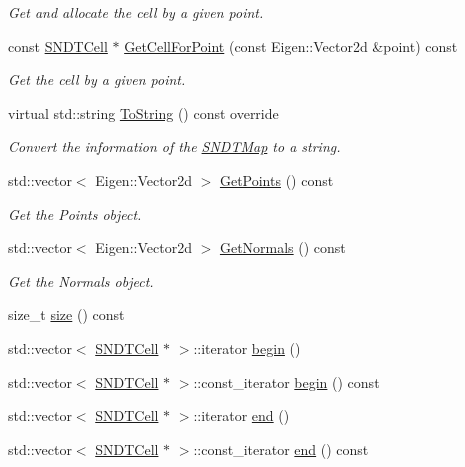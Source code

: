 \begin{DoxyCompactItemize}
\begin{DoxyCompactList}\small\item\em Get and allocate the cell by a given point. \end{DoxyCompactList}\item 
const \hyperlink{classSNDTCell}{S\+N\+D\+T\+Cell} $\ast$ \hyperlink{classSNDTMap_a6b7fa06144fcde3cb9e9df560d48bdee}{Get\+Cell\+For\+Point} (const Eigen\+::\+Vector2d \&point) const
\begin{DoxyCompactList}\small\item\em Get the cell by a given point. \end{DoxyCompactList}\item 
virtual std\+::string \hyperlink{classSNDTMap_a38be62c377da486f006e194e24e77212}{To\+String} () const override
\begin{DoxyCompactList}\small\item\em Convert the information of the \hyperlink{classSNDTMap}{S\+N\+D\+T\+Map} to a string. \end{DoxyCompactList}\item 
std\+::vector$<$ Eigen\+::\+Vector2d $>$ \hyperlink{classSNDTMap_acbbeb724448c6284121490a2ab302985}{Get\+Points} () const
\begin{DoxyCompactList}\small\item\em Get the Points object. \end{DoxyCompactList}\item 
std\+::vector$<$ Eigen\+::\+Vector2d $>$ \hyperlink{classSNDTMap_a7a2dea761cc5767e9c216b4dc9170cec}{Get\+Normals} () const
\begin{DoxyCompactList}\small\item\em Get the Normals object. \end{DoxyCompactList}\item 
size\+\_\+t \hyperlink{classSNDTMap_a5dadf53cf219ea37fb6bba8c70b41a5e}{size} () const
\item 
std\+::vector$<$ \hyperlink{classSNDTCell}{S\+N\+D\+T\+Cell} $\ast$ $>$\+::iterator \hyperlink{classSNDTMap_a2514d18c921a37d25a43adce58f19bfd}{begin} ()
\item 
std\+::vector$<$ \hyperlink{classSNDTCell}{S\+N\+D\+T\+Cell} $\ast$ $>$\+::const\+\_\+iterator \hyperlink{classSNDTMap_a18c7df6c92de6cb0d27399153ed3feab}{begin} () const
\item 
std\+::vector$<$ \hyperlink{classSNDTCell}{S\+N\+D\+T\+Cell} $\ast$ $>$\+::iterator \hyperlink{classSNDTMap_a0df8cc3fc6db19aa009f9229590445bb}{end} ()
\item 
std\+::vector$<$ \hyperlink{classSNDTCell}{S\+N\+D\+T\+Cell} $\ast$ $>$\+::const\+\_\+iterator \hyperlink{classSNDTMap_a521ae4876c13844c648726fb005b4400}{end} () const
\end{DoxyCompactItemize}
